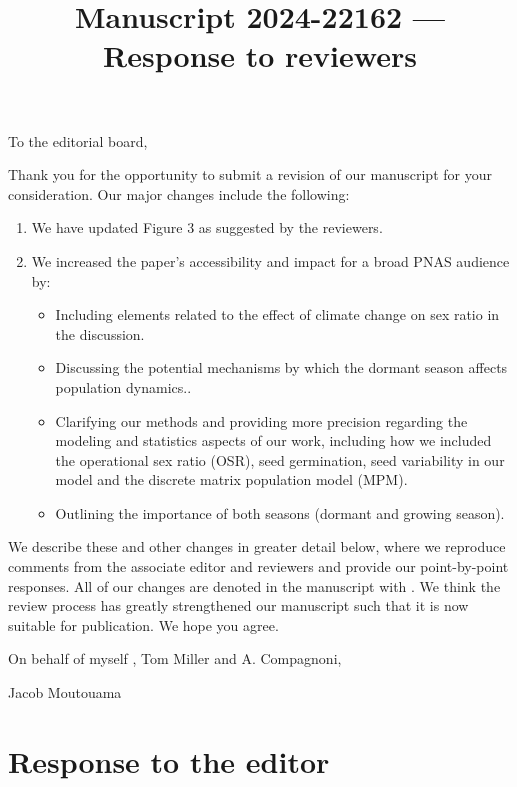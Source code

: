 \documentclass[12pt]{article}
\newcommand{\revise}[1]{{\color{Mahogany}{#1}}}
\begin{document}
\title{Manuscript 2024-22162 --- Response to reviewers}

\maketitle
\noindent To the editorial board,

Thank you for the opportunity to submit a revision of our manuscript for your consideration. Our major changes include the following:
\begin{enumerate}
	\item We have updated  Figure 3 as suggested by the reviewers.
	\item We increased the paper’s accessibility and impact for a broad PNAS audience by: 
	\begin{itemize}
	\item Including elements related to the effect of climate change on sex ratio in the discussion. 
	\item Discussing the potential mechanisms by which the dormant season affects population dynamics..
	\item Clarifying our methods and providing more precision regarding the modeling and statistics aspects of our work, including how we included the operational sex ratio (OSR), seed germination, seed variability in our model and the discrete matrix population model (MPM).
	\item Outlining the importance of both seasons  (dormant and growing season).
	\end{itemize}
\end{enumerate}

We describe these and other changes in greater detail below, where we reproduce comments from the associate editor and reviewers and provide our point-by-point responses. 
All of our changes are denoted in the manuscript with \revise{Mahogany font}.
We think the review process has greatly strengthened our manuscript such that it is now suitable for publication.
We hope you agree. 

\vspace{2em}
\hfill On behalf of myself , Tom Miller and A. Compagnoni,

\hfill  Jacob Moutouama
\newpage

\section{Response to  the editor}
\vspace{-2em}
\end{document}
